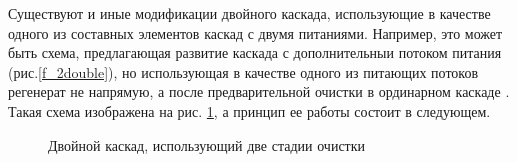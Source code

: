 Существуют и иные модификации двойного каскада, использующие в качестве одного из составных элементов каскад с двумя питаниями. Например, это может быть схема, предлагающая развитие каскада с дополнительныи потоком питания (рис.\ref{f_2double}), но использующая в качестве одного из питающих потоков регенерат не напрямую, а после предварительной очистки в ординарном каскаде \cite{palkinOchistkaRegenerirovannogoGeksaftorida2013}. Такая схема изображена на рис. \ref{fig:double_palk}, а принцип ее работы состоит в следующем.

\begin{figure}[ht]
  \caption{Двойной каскад, использующий две стадии очистки}\label{fig:double_palk}
\end{figure}

